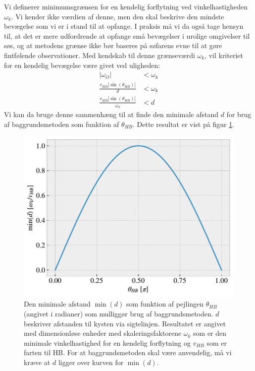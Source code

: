 \documentclass[%
 reprint,
nofootinbib,
aps,
]{revtex4-1}
\begin{document}
Vi definerer minimumsgrænsen for en kendelig forflytning ved vinkelhastigheden $\omega_k$. Vi kender ikke værdien af denne, men den skal beskrive den mindste bevægelse som vi er i stand til at opfange. I praksis må vi da også tage hensyn til, at det er mere udfordrende at opfange små bevægelser i urolige omgivelser til søs, og at metodens grænse ikke bør baseres på søfarens evne til at gøre fintfølende observationer. Med kendskab til denne grænseværdi $\omega_k$, vil kriteriet for en kendelig bevægelse være givet ved uligheden:
\begin{align}
 |\omega_O| &< \omega_k \nonumber \\
 \frac{v_{HB}|\sin{(\theta_{HB})}|}{d} &< \omega_k \nonumber \\
 \frac{v_{HB}|\sin{(\theta_{HB})}|}{\omega_k} &< d
 \label{eq:limit}
\end{align}
Vi kan da bruge denne sammenhæng til at finde den minimale afstand $d$ for brug af baggrundsmetoden som funktion af $\theta_{HB}$. Dette resultat er vist på figur \ref{fig:limit_dimensionless}.
 \begin{figure}[H]
   \includegraphics[width=\linewidth]{figures/limit_dimensionless.pdf}
   \caption{Den minimale afstand $\min{(d)}$ som funktion af pejlingen $\theta_{HB}$ (angivet i radianer) som mulliggør brug af baggrundsmetoden. $d$ beskriver afstanden til kysten via sigtelinjen. Resultatet er angivet med dimensionløse enheder med skaleringsfaktorene $\omega_k$ som er den minimale vinkelhastighed for en kendelig forflytning og $v_{HB}$ som er farten til HB. For at baggrundsmetoden skal være anvendelig, må vi kræve at $d$ ligger over kurven for $\min{(d)}$.}
   \label{fig:limit_dimensionless}
 \end{figure}
\end{document}
